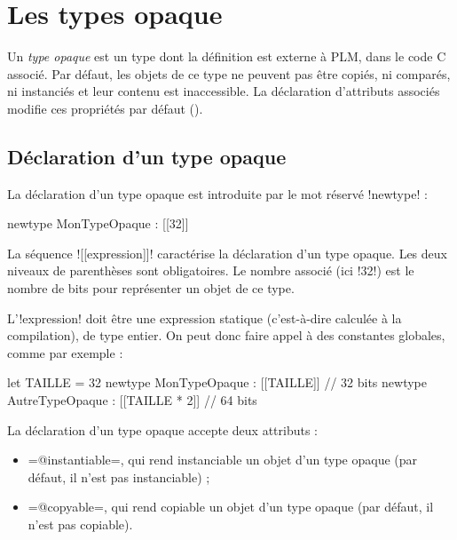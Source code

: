 




\chapter{Les types opaque}

Un \emph{type opaque} est un type dont la définition est externe à PLM, dans le code C associé. Par défaut, les objets de ce type ne peuvent pas être copiés, ni comparés, ni instanciés et leur contenu est inaccessible. La déclaration d'attributs associés modifie ces propriétés par défaut ().

\section{Déclaration d'un type opaque}

La déclaration d'un type opaque est introduite par le mot réservé \plm!newtype! :

\begin{PLM}
newtype MonTypeOpaque : [[32]]
\end{PLM}

La séquence \plm![[expression]]! caractérise la déclaration d'un type opaque. Les deux niveaux de parenthèses sont obligatoires. Le nombre associé (ici \plm!32!) est le nombre de bits pour représenter un objet de ce type.

L'\plm!expression! doit être une expression statique (c'est-à-dire calculée à la compilation), de type entier. On peut donc faire appel à des constantes globales, comme par exemple :

\begin{PLM}
let TAILLE = 32
newtype MonTypeOpaque : [[TAILLE]] // 32 bits
newtype AutreTypeOpaque : [[TAILLE * 2]] // 64 bits
\end{PLM}






La déclaration d'un type opaque accepte deux attributs :
\begin{itemize}
\item \plm=@instantiable=, qui rend instanciable un objet d'un type opaque (par défaut, il n'est pas instanciable) ;
\item \plm=@copyable=, qui rend copiable un objet d'un type opaque (par défaut, il n'est pas copiable).
\end{itemize}

